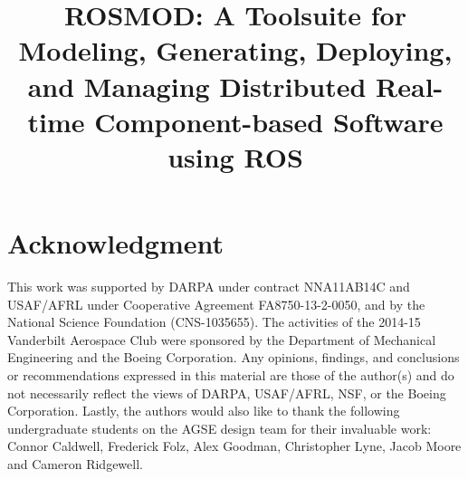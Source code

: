 \documentclass[conference]{IEEEtran}
\begin{document}
%
\title{ROSMOD: A Toolsuite for Modeling, Generating, Deploying, and Managing Distributed Real-time Component-based Software using ROS}


\author{
\and
{}
}


\maketitle









\section*{Acknowledgment}

This work was supported by DARPA under contract NNA11AB14C and USAF/AFRL under Cooperative Agreement FA8750-13-2-0050, and by the National Science Foundation (CNS-1035655). The activities of the 2014-15 Vanderbilt Aerospace Club were sponsored by the Department of Mechanical Engineering and the Boeing Corporation. Any opinions, findings, and conclusions or recommendations expressed in this material are those of the author(s) and do not necessarily reflect the views of DARPA, USAF/AFRL, NSF, or the Boeing Corporation. Lastly, the authors would also like to thank the following undergraduate students on the AGSE design team for their invaluable work: Connor Caldwell, Frederick Folz, Alex Goodman, Christopher Lyne, Jacob Moore and Cameron Ridgewell.






\end{document}
